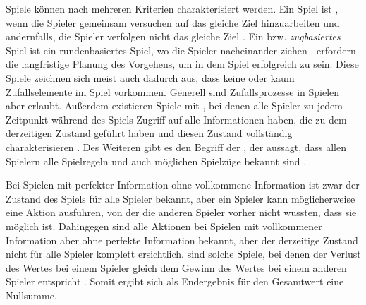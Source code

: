 Spiele können nach mehreren Kriterien charakterisiert werden. Ein Spiel ist , wenn die Spieler gemeinsam versuchen auf das gleiche Ziel hinzuarbeiten und  andernfalls, \dash die Spieler verfolgen nicht das gleiche Ziel \cite{2018.CooperativeGames}. Ein  bzw. \emph{zugbasiertes} Spiel ist ein rundenbasiertes Spiel, wo die Spieler nacheinander ziehen \cite[S. 251]{2018.SequentialGame}.  erfordern die langfristige Planung des Vorgehens, um in dem Spiel erfolgreich zu sein. Diese Spiele zeichnen sich meist auch dadurch aus, dass keine oder kaum Zufallselemente im Spiel vorkommen. Generell sind Zufallsprozesse in Spielen aber erlaubt. Außerdem existieren Spiele mit , bei denen alle Spieler zu jedem Zeitpunkt während des Spiels Zugriff auf alle Informationen haben, die zu dem derzeitigen Zustand geführt haben und diesen Zustand vollständig charakterisieren \cite[S. 156]{1194.SearchAndAiInGames}. Des Weiteren gibt es den Begriff der , der aussagt, dass allen Spielern alle Spielregeln und auch möglichen Spielzüge bekannt sind \cite[S. 1]{2017.AlphaBeta}.

Bei Spielen mit perfekter Information ohne vollkommene Information ist zwar der Zustand des Spiels für alle Spieler bekannt, aber ein Spieler kann möglicherweise eine Aktion ausführen, von der die anderen Spieler vorher nicht wussten, dass sie möglich ist. Dahingegen sind alle Aktionen bei Spielen mit vollkommener Information aber ohne perfekte Information bekannt, aber der derzeitige Zustand nicht für alle Spieler komplett ersichtlich.  sind solche Spiele, bei denen der Verlust des Wertes bei einem Spieler gleich dem Gewinn des Wertes bei einem anderen Spieler entspricht \cite{2022.ZeroSumGame}. Somit ergibt sich als Endergebnis für den Gesamtwert eine Nullsumme.

